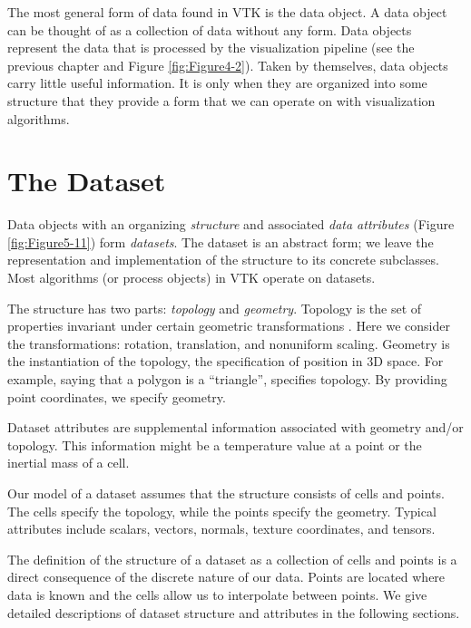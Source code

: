 The most general form of data found in VTK is the data object. A data object can be thought of as a collection of data without any form. Data objects represent the data that is processed by the visualization pipeline (see the previous chapter and Figure \ref{fig:Figure4-2}). Taken by themselves, data objects carry little useful information. It is only when they are organized into some structure that they provide a form that we can operate on with visualization algorithms.

\section{The Dataset}
\label{sec:dataset}

Data objects with an organizing \emph{structure} and associated \emph{data attributes} (Figure \ref{fig:Figure5-11}) form \emph{datasets}. The dataset is an abstract form; we leave the representation and implementation of the structure to its concrete subclasses. Most algorithms (or process objects) in VTK operate on datasets.

The structure has two parts: \emph{topology} and \emph{geometry}. Topology is the set of properties invariant under certain geometric transformations \cite{Weiler86}. Here we consider the transformations: rotation, translation, and nonuniform scaling. Geometry is the instantiation of the topology, the specification of position in 3D space. For example, saying that a polygon is a ``triangle'', specifies topology. By providing point coordinates, we specify geometry.

Dataset attributes are supplemental information associated with geometry and/or topology. This information might be a temperature value at a point or the inertial mass of a cell.

Our model of a dataset assumes that the structure consists of cells and points. The cells specify the topology, while the points specify the geometry. Typical attributes include scalars, vectors, normals, texture coordinates, and tensors.

The definition of the structure of a dataset as a collection of cells and points is a direct consequence of the discrete nature of our data. Points are located where data is known and the cells allow us to interpolate between points. We give detailed descriptions of dataset structure and attributes in the following sections.

